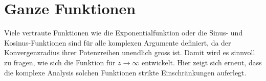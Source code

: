 %
%
%
\section{Ganze Funktionen
\label{buch:analytisch:section:ganz}}
%
Viele vertraute Funktionen wie die Exponentialfunktion oder die Sinus-
und Kosinus-Funktionen sind für alle komplexen Argumente definiert,
da der Konvergenzradius ihrer Potenzreihen unendlich gross ist.
Damit wird es sinnvoll zu fragen, wie sich die Funktion für $z\to\infty$ 
entwickelt.
Hier zeigt sich erneut, dass die komplexe Analysis solchen Funktionen
strikte Einschränkungen auferlegt.




